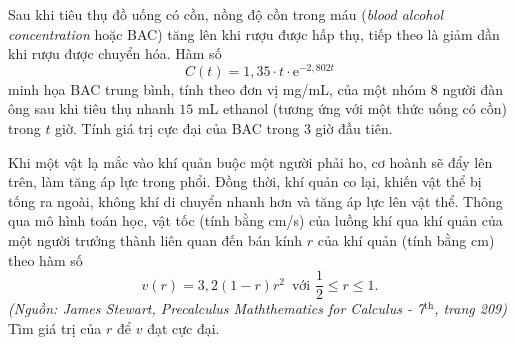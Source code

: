 \begin{bt}%
	Sau khi tiêu thụ đồ uống có cồn, nồng độ cồn trong máu (\textit{blood alcohol concentration} hoặc BAC) tăng lên khi rượu được hấp thụ, tiếp theo là giảm dần khi rượu được chuyển hóa. Hàm số $$C(t)=1{,}35\cdot t\cdot \mathrm{e}^{-2{,}802t}$$ minh họa BAC trung bình, tính theo đơn vị mg/mL, của một nhóm $8$ người đàn ông sau khi tiêu thụ nhanh $15$ mL ethanol (tương ứng với một thức uống có cồn) trong $t$ giờ. Tính giá trị cực đại của BAC trong $3$ giờ đầu tiên.
\end{bt}

\begin{bt}%
	Khi một vật lạ mắc vào khí quản buộc một người phải ho, cơ hoành sẽ đẩy lên trên, làm tăng áp lực trong phổi. Đồng thời, khí quản co lại, khiến vật thể bị tống ra ngoài, không khí di chuyển nhanh hơn và tăng áp lực lên vật thể. Thông qua mô hình toán học, vật tốc (tính bằng cm/s) của luồng khí qua khí quản của một người trưởng thành liên quan đến bán kính $r$ của khí quản (tính bằng cm) theo hàm số 
	$$v(r)=3{,}2(1-r)r^2\, \text{ với }\dfrac{1}{2}\le r\le 1.$$
	\textit{(Nguồn: James Stewart, Precalculus Maththematics for Calculus - 7$^\text{th}$, trang 209)}\\
	Tìm giá trị của $r$ để $v$ đạt cực đại.
\end{bt}

